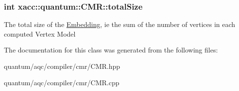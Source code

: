 \subsubsection[{\texorpdfstring{total\+Size}{totalSize}}]{\setlength{\rightskip}{0pt plus 5cm}int xacc\+::quantum\+::\+C\+M\+R\+::total\+Size\hspace{0.3cm}{\ttfamily [protected]}}\hypertarget{a00032_ac394cc5299f299d2d441c0e1cb9b1d17}{}\label{a00032_ac394cc5299f299d2d441c0e1cb9b1d17}
The total size of the \hyperlink{a00051}{Embedding}, ie the sum of the number of vertices in each computed Vertex Model 

The documentation for this class was generated from the following files\+:\begin{DoxyCompactItemize}
\item 
quantum/aqc/compiler/cmr/\+C\+M\+R.\+hpp\item 
quantum/aqc/compiler/cmr/\+C\+M\+R.\+cpp\end{DoxyCompactItemize}
